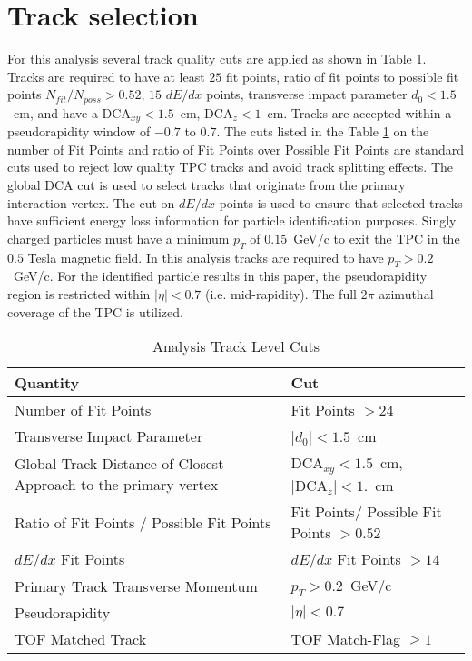 \section{Track selection}\label{chap:trackCut}
For this analysis several track quality cuts are applied as shown in Table \ref{tab:trackCut}. Tracks are required to have at least $25$ fit points, ratio of fit points to possible fit points $N_{fit}/N_{poss}>0.52$, $15$ $dE/dx$ points, transverse impact parameter $d_0<1.5$~cm, and have a $\textrm{DCA}_{xy}<1.5$~cm, $\textrm{DCA}_{z}<1$~cm. Tracks are accepted within a pseudorapidity window of $-0.7$ to $0.7$.
The cuts listed in the Table \ref{tab:trackCut} on the number of Fit Points and ratio of Fit Points over Possible Fit Points are standard cuts used to reject low quality TPC tracks and avoid track splitting effects. The global
$\textrm{DCA}$ cut is used to select tracks that originate from the primary interaction vertex. The cut
on $dE/dx$ points is used to ensure that selected tracks have sufficient energy loss information
for particle identification purposes. Singly charged particles
must have a minimum $p_T$ of $0.15$~GeV/c to exit the TPC
in the $0.5$ Tesla magnetic field. In this analysis tracks
are required to have $p_T > 0.2$~GeV/c. For the identified
particle results in this paper, the pseudorapidity region is restricted
within $|\eta| < 0.7$ (i.e. mid-rapidity). The full $2\pi$ azimuthal coverage of the TPC is utilized.

	\begin{table}[H]
		\centering
		\begin{tabular}{| l | l |}
			\hline			
			Quantity & Cut \\
			\hline
			\hline
			Number of Fit Points & Fit Points $>24$\\
			Transverse Impact Parameter & $|d_0|<1.5$~cm\\ 
			Global Track Distance of Closest Approach to the primary vertex & $\textrm{DCA}_{xy}<1.5$~cm, $|\textrm{DCA}_{z}|<1.$~cm\\
			Ratio of Fit Points / Possible Fit Points & Fit Points/ Possible Fit Points $>0.52$\\
			$dE/dx$ Fit Points & $dE/dx$ Fit Points $>14$\\
			Primary Track Transverse Momentum & $p_{T}>0.2$~GeV/c\\
			Pseudorapidity & $|\eta|<0.7$\\
			TOF Matched Track & TOF Match-Flag $\geq1$\\
			\hline  
		\end{tabular}
		\caption[Analysis Track Level Cuts]{Analysis Track Level Cuts}
		\label{tab:trackCut}
	\end{table}

